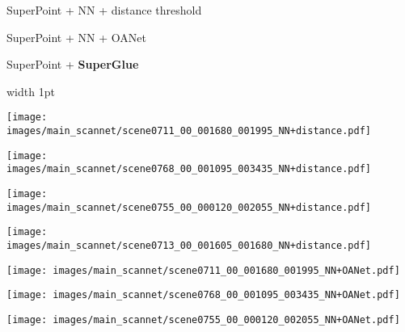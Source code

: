 \documentclass[10pt,twocolumn,letterpaper]{article}
\renewcommand{\*}[1]{\mathbf{#1}}
\renewcommand{\b}[1]{\textbf{#1}}
\newcommand{\0}{\phantom{0}}
\begin{document}
\begin{figure*}[ht!]
\centering
\begin{minipage}{0.02\textwidth}
    \hfill
\end{minipage}\hspace{1mm}\begin{minipage}{0.32\textwidth}
    \centering
    \small{SuperPoint + NN + distance threshold}
\end{minipage}\hspace{1mm}\begin{minipage}{0.32\textwidth}
    \centering
    \small{SuperPoint + NN + OANet}
\end{minipage}\hspace{1mm}\begin{minipage}{0.32\textwidth}
    \centering
    \small{SuperPoint + \b{SuperGlue}}
\end{minipage}

\begin{minipage}{0.02\textwidth}
\end{minipage}\hfill{\vline width 1pt}\hfill
\hspace{1mm}\begin{minipage}{0.32\textwidth}
    \texttt{[image: images/main\_scannet/scene0711\_00\_001680\_001995\_NN+distance.pdf]}
    
    \vspace{.5mm}
    \texttt{[image: images/main\_scannet/scene0768\_00\_001095\_003435\_NN+distance.pdf]}
    
    \vspace{.5mm}
    \texttt{[image: images/main\_scannet/scene0755\_00\_000120\_002055\_NN+distance.pdf]}

    \vspace{.5mm}
    \texttt{[image: images/main\_scannet/scene0713\_00\_001605\_001680\_NN+distance.pdf]}
\end{minipage}\hspace{1mm}\begin{minipage}{0.32\textwidth}
    \texttt{[image: images/main\_scannet/scene0711\_00\_001680\_001995\_NN+OANet.pdf]}
    
    \vspace{.5mm}
    \texttt{[image: images/main\_scannet/scene0768\_00\_001095\_003435\_NN+OANet.pdf]}
    
    \vspace{.5mm}
    \texttt{[image: images/main\_scannet/scene0755\_00\_000120\_002055\_NN+OANet.pdf]}
    

\end{minipage}
\end{figure*}
\end{document}
